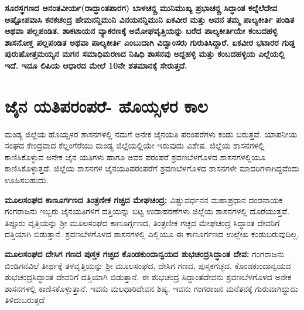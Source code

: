 \textbf{ಸೂರಸ್ಥಗಣದ ಅನಂತವೀರ್ಯ(ರಾದ್ಧಾಂತಪಾರಗ)\general{\enginline{-}} ಬಾಳಚನ್ದ್ರ ಮುನಿಮುಖ್ಯ \general{\enginline{-}} ಪ್ರಭಾಚನ್ದ್ರ ಸಿದ್ಧಾಂತ\general{\enginline{-}} ಕಲ್ನೆಲೆದೇವ\general{\enginline{-}} ಅಷ್ಟೋಪವಾಸಿ ಕನಕಚಂದ್ರ \general{\enginline{-}} ಹೇಮನನ್ದಿಮುನಿ \general{\enginline{-}} ವಿನಯನನ್ದಿಮುನಿ \general{\enginline{-}} ಏಕವೀರ ಮತ್ತು ಅವನ ತಮ್ಮ ಪಾಲ್ಯಕೀರ್ತಿ ಪಂಡಿತ ಅಥವಾ ಪಲ್ಲಪಂಡಿತ. ಶಾಕಟಾಯನ ವ್ಯಾಕರಣಕ್ಕೆ ಅಮೋಘವೃತ್ತಿಯನ್ನು ಬರೆದ ಪಾಲ್ಯಕೀರ್ತಿಯೇ ಕಂಬದಹಳ್ಳಿ ಶಾಸನೋಕ್ತ ಪಲ್ಲಪಂಡಿತ ಅಥವಾ ಪಾಲ್ಯಕೀರ್ತಿ ಎಂಬುದಾಗಿ ವಿದ್ವಾಂಸರು ಗುರುತಿಸಿದ್ದಾರೆ. ಏಕವೀರ ಭಟಾರರ ಗುಡ್ಡ ಪುರುಷೋತ್ತಮಯ್ಯನ ಮಗನ ಸಮಾಧಿಮರಣದ ನಿಷಿಧಿ ಶಾಸನವು ಅದ್ದಹಳ್ಳಿ ಮತ್ತು ಕಂಬದಹಳ್ಳಿಯ ಎಲ್ಲೆಯಲ್ಲಿ ಇದೆ. ಇದೂ ಲಿಪಿಯ ಆಧಾರದ ಮೇಲೆ 10ನೇ ಶತಮಾನಕ್ಕೆ ಸೇರುತ್ತದೆ.}

\section*{ಜೈನ ಯತಿಪರಂಪರೆ- ಹೊಯ್ಸಳರ ಕಾಲ}

ಮಂಡ್ಯ ಜಿಲ್ಲೆಯ ಹೊಯ್ಸಳರ ಶಾಸನಗಳಲ್ಲಿ ನಮಗೆ ಅನೇಕ ಜೈನಯತಿ ಪರಂಪರೆಗಳು ಕಂಡು ಬರುತ್ತವೆ. ಯಾಪನೀಯ ಸಂಘದ ಕೇಂದ್ರವಾದ ಕೆಲ್ಲಂಗೆರೆಯು ಮಂಡ್ಯ ಜಿಲ್ಲೆಯಲ್ಲಿಯೇ ಇರುವುದು ವಿಶೇಷ. ಜಿಲ್ಲೆಯ ಶಾಸನಗಳಲ್ಲಿ ಕಾಣಿಸಿಕೊಳ್ಳುವ ಅನೇಕ ಜೈನ ಯತಿಗಳು ಹಾಗೂ ಅವರ ಪರಂಪರೆ ಶ್ರವಣಬೆಳಗೊಳದ ಶಾಸನಗಳಲ್ಲಿಯೂ ಕಾಣಿಸಿಕೊಳ್ಳುತ್ತದೆ. ಜಿಲ್ಲೆಯ ಶಾಸನಗಳ ಜೈನಯತಿಪರಂಪರೆಗೆ ಶ್ರವಣಬೆಳಗೊಳದ ಶಾಸನಗಳೇ ಮಾದರಿಗಳಾಗಿದ್ದವೆಂದು ಊಹಿಸಬಹುದು.

\textbf{ಮೂಲಸಂಘದ ಕಾಣೂರ್ಗಣದ ತಿಂತ್ರಣೀಕ ಗಚ್ಛದ ಮೇಘಚಂದ್ರ:} ವಿಷ್ಣುವರ್ಧನನ ಮಹಾಪ್ರಧಾನ ದಂಡನಾಯಕ ಗಂಗರಾಜನು ಇಬ್ಬರು ಜೈನಯತಿಗಳಿಗೆ ದತ್ತಿಯನ್ನು ಬಿಟ್ಟ ಉದಾಹರಣೆಗಳು ಜಿಲ್ಲೆಯ ಶಾಸನಗಳಲ್ಲಿ ದೊರೆಯುತ್ತವೆ. ತಿಪ್ಪೂರು ವೃತ್ತಿಯನ್ನು ಶ‍್ರೀ ಮೂಲಸಂಘದ ಕಾಣೂರ್ಗ್ಗಣದ, ತಿಂತ್ರಣೀಕ ಗಚ್ಛದ ಮೇಘಚಂದ್ರ ಸಿದ್ಧಾಂತ ದೇವರಿಗೆ ದತ್ತಿಯಾಗಿ ಬಿಡುತ್ತಾನೆ. ಶ್ರವಣಬೆಳಗೊಳದ ಶಾಸನಗಳಲ್ಲಿ ಎಲ್ಲಿಯೂ ಈ ಕಾಣೂರ್ಗಣದ ಉಲ್ಲೇಖ ಕಂಡುಬರುವುದಿಲ್ಲ.

\newpage

\textbf{ಮೂಲಸಂಘದ ದೇಸಿಗ ಗಣದ ಪುಸ್ತಕ ಗಚ್ಛದ ಕೊಂಡಕುಂದಾನ್ವಯದ ಶುಭಚಂದ್ರಸಿದ್ಧಾಂತ ದೇವ:} ಗಂಗರಾಜನು ಬಿಂಡಿಗನವಿಲೆ ತೀರ್ಥಕ್ಕೆ ತಳವೃತ್ತಿಯನ್ನು ಶ‍್ರೀ ಮೂಲಸಂಘದ, ದೇಸಿಗ ಗಣದ, ಪುಸ್ತಕಗಚ್ಛದ, ಕೊಂಡಕುಂದಾನ್ವಯದ ಶುಭಚಂದ್ರಸಿದ್ಧಾಂತ ದೇವರಿಗೆ ದತ್ತಿಯಾಗಿ ಬಿಡುತ್ತಾನೆ. ಈ ಶುಭಚಂದ್ರ ಸಿದ್ಧಾಂತದೇವನು ಶ್ರವಣಬೆಳಗೊಳದ ಅನೇಕ ಶಾಸನಗಳಲ್ಲಿ ಕಾಣಿಸಕೊಳ್ಳುತ್ತಾನೆ. ಇವನು ಮಲಧಾರಿದೇವನ ಶಿಷ್ಯ. ಇವನು ಗಂಗರಾಜನ ಮನೆತನಕ್ಕೆ ಗುರುವಾಗಿದ್ದುದು ತಿಳಿದುಬರುತ್ತದೆ

